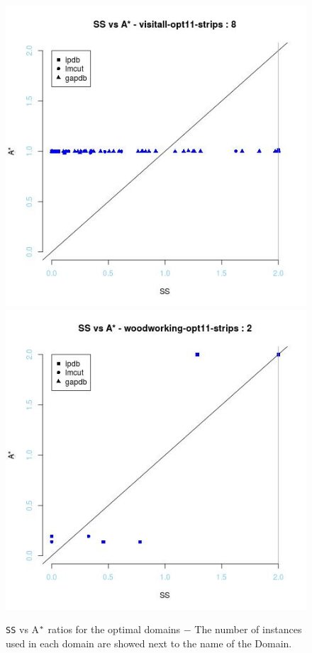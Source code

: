 \begin{figure}[!htb]
  \includegraphics[width=\linewidth]{images/visitall-opt11-strips}
\endminipage\hfill
{}
  \includegraphics[width=\linewidth]{images/woodworking-opt11-strips}
\endminipage\hfill
\caption{\texttt{SS} vs A$\sp{*}$ ratios for the optimal domains $-$ The number of instances used in each domain are showed next to the name of the Domain.}\label{fig:img_analysis_domains}
\end{figure}

